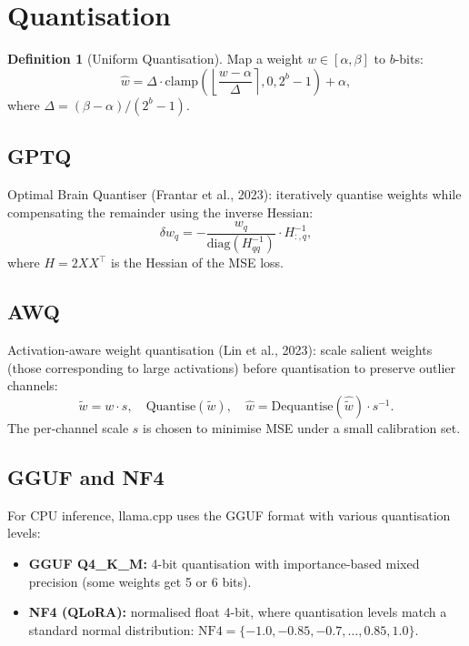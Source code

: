 \documentclass[11pt,a4paper]{book}
\theoremstyle{definition}
\newtheorem{definition}{Definition}[chapter]
\begin{document}
\section{Quantisation}

\begin{definition}[Uniform Quantisation]
	Map a weight $w \in [\alpha, \beta]$ to $b$-bits:
	\begin{equation}
		\hat{w} = \Delta \cdot \text{clamp}\left(\left\lfloor \frac{w - \alpha}{\Delta} \right\rceil, 0, 2^b - 1\right) + \alpha,
	\end{equation}
	where $\Delta = (\beta - \alpha) / (2^b - 1)$.
\end{definition}

\subsection{GPTQ}

Optimal Brain Quantiser (Frantar et al., 2023): iteratively quantise weights while compensating the remainder using the inverse Hessian:
\begin{equation}
	\delta w_q = -\frac{w_q}{\text{diag}(H_{qq}^{-1})} \cdot H_{:,q}^{-1},
\end{equation}
where $H = 2XX^\top$ is the Hessian of the MSE loss.

\subsection{AWQ}

Activation-aware weight quantisation (Lin et al., 2023): scale salient weights (those corresponding to large activations) before quantisation to preserve outlier channels:
\begin{equation}
	\tilde{w} = w \cdot s, \quad \text{Quantise}(\tilde{w}), \quad \hat{w} = \text{Dequantise}(\hat{\tilde{w}}) \cdot s^{-1}.
\end{equation}
The per-channel scale $s$ is chosen to minimise MSE under a small calibration set.

\subsection{GGUF and NF4}

For CPU inference, llama.cpp uses the GGUF format with various quantisation levels:
\begin{itemize}
	\item \textbf{GGUF Q4\_K\_M:} 4-bit quantisation with importance-based mixed precision (some weights get 5 or 6 bits).
	\item \textbf{NF4 (QLoRA):} normalised float 4-bit, where quantisation levels match a standard normal distribution: $\text{NF4} = \{ -1.0, -0.85, -0.7, \dots, 0.85, 1.0 \}$.
\end{itemize}
\end{document}
